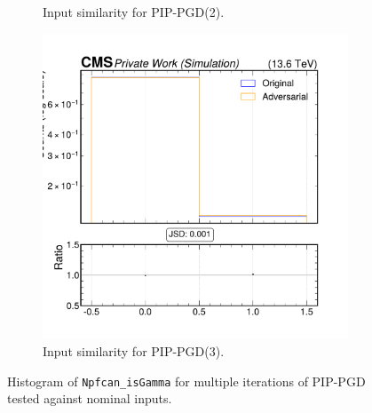 \begin{figure}[h]
\begin{subfigure}[t]{0.32\textwidth}
    \caption*{Input similarity for PIP-PGD(2).}
  \end{subfigure}\hfill
  \begin{subfigure}[t]{0.32\textwidth}
    \includegraphics[width=\linewidth]{media/output/features/compare/combined_it_3/cmp_npf_arr_Npfcan_isGamma.pdf}
    \caption*{Input similarity for PIP-PGD(3).}
  \end{subfigure}

  \caption*{Histogram of \texttt{Npfcan\_isGamma} for multiple iterations of PIP-PGD tested against nominal inputs.}
  \label{fig:combined_input_Npfcan_isGamma}
\end{figure}

